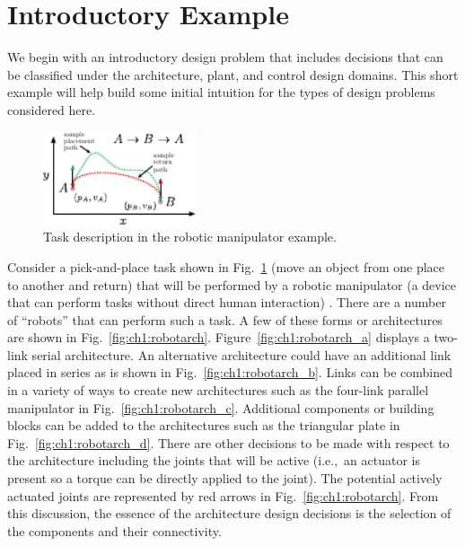 \section{Introductory Example\label{sec:ch1:example}}

We begin with an introductory design problem that includes decisions that can be classified under the architecture, plant, and control design domains.
This short example will help build some initial intuition for the types of design problems considered here.

\begin{figure}
\centering
\includegraphics[width=0.4\textwidth]{../ch1/figures/robotcontrol_a.pdf}
\caption{Task description in the robotic manipulator example.\label{fig:ch1:robotcontrol_a}}
\end{figure}

Consider a pick-and-place task shown in Fig.~\ref{fig:ch1:robotcontrol_a} (move an object from one place to another and return) that will be performed by a robotic manipulator (a device that can perform tasks without direct human interaction) \cite{Spong2005a}.
There are a number of ``robots'' that can perform such a task.
A few of these forms or architectures are shown in Fig.~\ref{fig:ch1:robotarch}.
Figure~\ref{fig:ch1:robotarch_a} displays a two-link serial architecture.
An alternative architecture could have an additional link placed in series as is shown in Fig.~\ref{fig:ch1:robotarch_b}.
Links can be combined in a variety of ways to create new architectures such as the four-link parallel manipulator in Fig.~\ref{fig:ch1:robotarch_c}.
Additional components or building blocks can be added to the architectures such as the triangular plate in Fig.~\ref{fig:ch1:robotarch_d}.
There are other decisions to be made with respect to the architecture including the joints that will be active (i.e.,~an actuator is present so a torque can be directly applied to the joint).
The potential actively actuated joints are represented by red arrows in Fig.~\ref{fig:ch1:robotarch}.
From this discussion, the essence of the architecture design decisions is the selection of the components and their connectivity.

